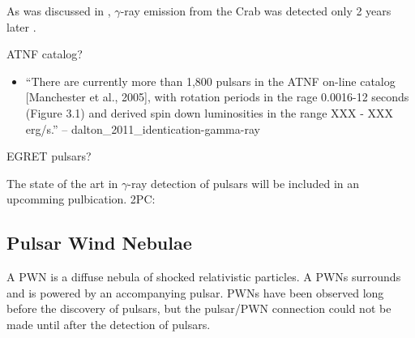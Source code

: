 As was discussed in ,
$\gamma$-ray emission from the Crab was detected only 2 years
later \citep{browning_1971_detection-pulsed}.


ATNF catalog?

\begin{itemize}
  \item ``There are currently more than 1,800 pulsars in the ATNF on-line
  catalog [Manchester et al., 2005], with rotation periods in the rage
  0.0016-12 seconds (Figure 3.1) and derived spin down
  luminosities in the range XXX - XXX erg/s.'' -- dalton\_2011\_identication-gamma-ray
\end{itemize}

EGRET pulsars?

The state of the art in $\gamma$-ray detection of pulsars
will be included in an upcomming pulbication.
2PC: 



\subsection{Pulsar Wind Nebulae}









A \ac{PWN} is a diffuse nebula of shocked relativistic particles.
A \acp{PWN} surrounds and is powered by an accompanying pulsar. 
\acp{PWN} have been observed long before the discovery of pulsars, but
the pulsar/\ac{PWN} connection could not be made until
after the detection of pulsars.

